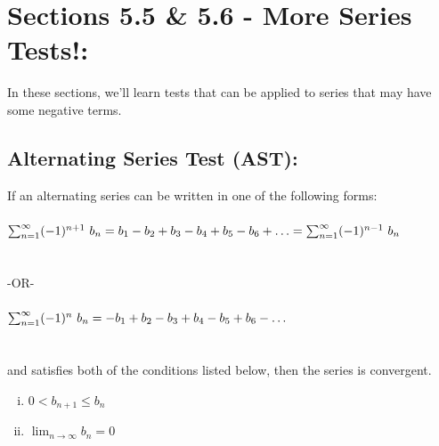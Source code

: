 
\setlength{\columnseprule}{.4pt}
\setlength{\columnsep}{3em}

\section*{Sections 5.5 \& 5.6 - More Series Tests!: }
In these sections, we'll learn tests that can be applied to series that may have some negative terms.\\

\vspace*{.1in}




\subsection*{Alternating Series Test (AST):}
If an alternating series can be written in one of the  following forms:\\ ~\\
\(\sum_{n=1}^\infty (-1)^{n+1}\ b_n = b_1 - b_2 + b_3 - b_4 + b_5 - b_6+ \ldots = \sum_{n=1}^\infty (-1)^{n-1}\ b_n\)\\~\\~\\
-OR-\\ ~\\
\(\sum_{n=1}^\infty (-1)^{n}\ b_n = -b_1 + b_2 - b_3 + b_4 - b_5 + b_6- \ldots\)\\~\\~\\
and satisfies both of the conditions listed below, then the series is convergent.
 \begin{enumerate}[(i)] 
 \item \(0<b_{n+1} \leq b_n\)
 \item \(\lim_{n\rightarrow \infty} b_n = 0\)
 \end{enumerate} 
 
 \vspace*{.5in}

